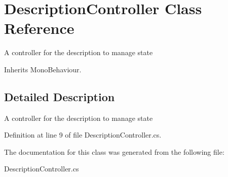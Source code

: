\hypertarget{class_description_controller}{}\section{Description\+Controller Class Reference}
\label{class_description_controller}


A controller for the description to manage state  




Inherits Mono\+Behaviour.



\subsection{Detailed Description}
A controller for the description to manage state 



Definition at line 9 of file Description\+Controller.\+cs.



The documentation for this class was generated from the following file\+:\begin{DoxyCompactItemize}
\item 
Description\+Controller.\+cs\end{DoxyCompactItemize}
